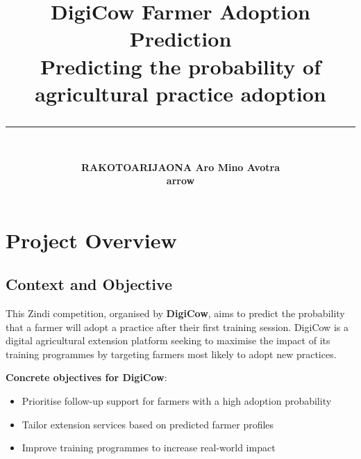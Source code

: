 \documentclass[12pt,a4paper]{article}
\title{
    \vspace{1cm}
    {\Huge\bfseries\color{primaryblue} DigiCow Farmer Adoption Prediction}\\[0.4cm]
    {\normalsize Predicting the probability of agricultural practice adoption}\\[0.5cm]
    \rule{\textwidth}{1pt}

}
\author{
    \\[1.5cm]
    \textbf{RAKOTOARIJAONA Aro Mino Avotra}\\[0.2cm]
    \text{Zindi username :} \textbf{arrow\textunderscore26}
}
\begin{document}
\maketitle
\thispagestyle{fancy}

\vspace{0.5cm}

\begin{center}
\end{center}
\newpage
\vspace{0.5cm}
\tableofcontents
\newpage

\section{Project Overview}

\subsection{Context and Objective}

This Zindi competition, organised by \textbf{DigiCow}, aims to predict the probability that a farmer will adopt a practice after their first training session. DigiCow is a digital agricultural extension platform seeking to maximise the impact of its training programmes by targeting farmers most likely to adopt new practices.

\textbf{Concrete objectives for DigiCow}:
\begin{itemize}[noitemsep]
    \item Prioritise follow-up support for farmers with a high adoption probability
    \item Tailor extension services based on predicted farmer profiles
    \item Improve training programmes to increase real-world impact
\end{itemize}
\end{document}
